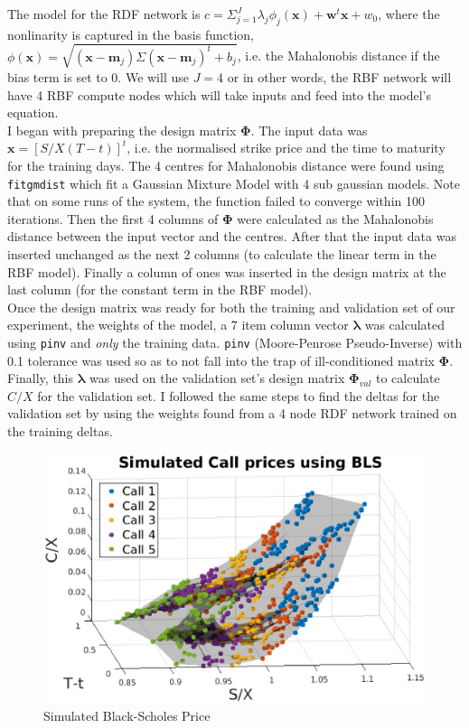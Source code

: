 \documentclass[11pt, fleqn]{article}
\begin{document}
The model for the RDF network is $c = \Sigma_{j=1}^J\lambda_j\phi_j(\bm{x}) + \bm{w}^t\bm{x} + w_0$, where the nonlinarity is captured in the basis function, $\phi(\bm{x}) = \sqrt{(\bm{x} - \bm{m}_j)\Sigma(\bm{x} - \bm{m}_j)^t + b_j}$, i.e. the Mahalonobis distance if the bias term is set to 0. We will use $J = 4$ or in other words, the RBF network will have 4 RBF compute nodes which will take inputs and feed into the model's equation.\\

I began with preparing the design matrix $\bm{\Phi}$. The input data was $\bm{x} = [S/X (T-t)]^t$, i.e. the normalised strike price and the time to maturity for the training days. The 4 centres for Mahalonobis distance were found using \texttt{fitgmdist} which fit a Gaussian Mixture Model with 4 sub gaussian models. Note that on some runs of the system, the function failed to converge within 100 iterations. Then the first 4 columns of $\bm{\Phi}$ were calculated as the Mahalonobis distance between the input vector and the centres. After that the input data was inserted unchanged as the next 2 columns (to calculate the linear term in the RBF model). Finally a column of ones was inserted in the design matrix at the last column (for the constant term in the RBF model).\\

Once the design matrix was ready for both the training and validation set of our experiment, the weights of the model, a 7 item column vector $\bm{\lambda}$ was calculated using \texttt{pinv} and \textit{only} the training data. \texttt{pinv} (Moore-Penrose Pseudo-Inverse) with 0.1 tolerance was used so as to not fall into the trap of ill-conditioned matrix $\bm{\Phi}$. Finally, this $\bm{\lambda}$ was used on the validation set's design matrix $\bm{\Phi}_{val}$ to calculate $C/X$ for the validation set. I followed the same steps to find the deltas for the validation set by using the weights found from a 4 node RDF network trained on the training deltas.\\

\begin{figure}[!h]
\begin{center}
	\includegraphics[scale=.6] {q1_simulated_bls.eps}
	\caption{Simulated Black-Scholes Price}
	\label{fig:q1-simulated-bls}
\end{center}
\end{figure}
\end{document}

